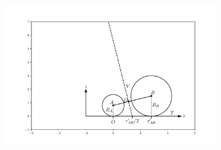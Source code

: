 \begin{figure}[tb]
	\centering
     
      \begin{subfigure}[b]{0.38\textwidth}
         \centering
         \includegraphics[width=\textwidth]{./figures/quasi2d/qtd_dia_a.pdf}
         \caption{}
         \label{fig:qtdda}
     \end{subfigure}
     \hfill
     

\end{figure}
